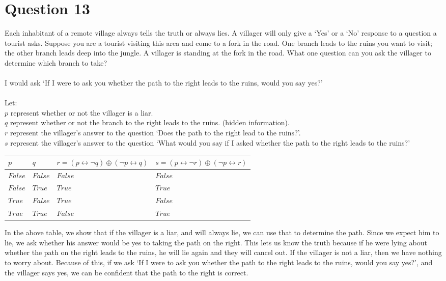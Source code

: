 \documentclass[12pt]{extarticle}
\begin{document}
\section*{Question 13}
	Each inhabitant of a remote village always tells the truth or always lies. A villager will only give a `Yes' or a `No' response to a question a tourist asks. Suppose you are a tourist visiting this area and come to a fork in the road. One branch leads to the ruins you want to visit; the other branch leads deep into the jungle. A villager is standing at the fork in the road. What one question can you ask the villager to determine which branch to take?\\\\
	I would ask `If I were to ask you whether the path to the right leads to the ruins, would you say yes?'\\\\
	Let:\\
		\hspace*{1cm}$p$ represent whether or not the villager is a liar.\\
		\hspace*{1cm}$q$ represent whether or not the branch to the right leads to the ruins. (hidden information).\\
		\hspace*{1cm}$r$ represent the villager's answer to the question `Does the path to the right lead to the ruins?'.\\
		\hspace*{1cm}$s$ represent the villager's answer to the question `What would you say if I asked whether the path to the right leads to the ruins?'\\
	\begin{center}
		\begin{tabular}{ | p{2cm} | p{2cm} | p{5cm} | p{5cm} |}
			\hline$p$ & $q$ & $r = (p \leftrightarrow \neg q) \oplus (\neg p \leftrightarrow q)$ & $s = (p \leftrightarrow \neg r) \oplus (\neg p \leftrightarrow  r)$ \\ \hline \hline
			$False$ & $False$ & $False$ & $False$\\ \hline 
			$False$ & $True$ & $True$ & $True$\\ \hline
			$True$ & $False$ & $True$ & $False$\\ \hline
			$True$ & $True$ & $False$ & $True$\\ \hline
		\end{tabular}
	\end{center}
	In the above table, we show that if the villager is a liar, and will always lie, we can use that to determine the path.  Since we expect him to lie, we ask whether his answer would be yes to taking the path on the right.  This lets us know the truth because if he were lying about whether the path on the right leads to the ruins, he will lie again and they will cancel out.  If the villager is not a liar, then we have nothing to worry about.  Because of this, if we ask `If I were to ask you whether the path to the right leads to the ruins, would you say yes?', and the villager says yes, we can be confident that the path to the right is correct.
\end{document}

